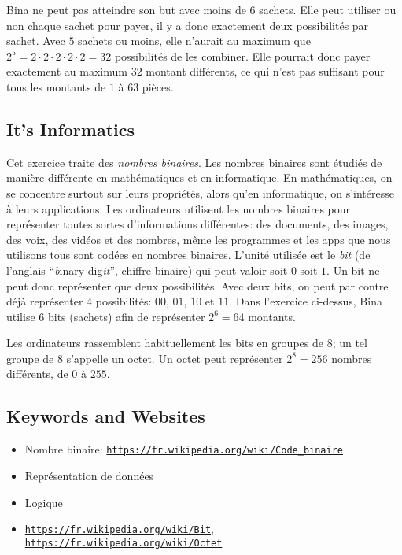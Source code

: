 \documentclass[a4paper,11pt]{report}
\newcommand{\BrochureUrlText}[1]{\texttt{#1}}
\begin{document}
Bina ne peut pas atteindre son but avec moins de $6$ sachets. Elle peut utiliser ou non chaque sachet pour payer, il y a donc exactement deux possibilités par sachet. Avec $5$ sachets ou moins, elle n’aurait au maximum que ${2^5 = 2 \cdot 2 \cdot 2 \cdot 2 \cdot 2 = 32}$ possibilités de les combiner. Elle pourrait donc payer exactement au maximum $32$ montant différents, ce qui n’est pas suffisant pour tous les montants de $1$ à $63$ pièces.


\subsection*{It’s Informatics}

Cet exercice traite des \emph{nombres binaires}. Les nombres binaires sont étudiés de manière différente en mathématiques et en informatique. En mathématiques, on se concentre surtout sur leurs propriétés, alors qu’en informatique, on s’intéresse à leurs applications. Les ordinateurs utilisent les nombres binaires pour représenter toutes sortes d’informations différentes: des documents, des images, des voix, des vidéos et des nombres, même les programmes et les apps que nous utilisons tous sont codées en nombres binaires. L’unité utilisée est le \emph{bit} (de l’anglais “\emph{b}inary dig\emph{it}”, chiffre binaire) qui peut valoir soit $0$ soit $1$. Un bit ne peut donc représenter que deux possibilités. Avec deux bits, on peut par contre déjà représenter $4$ possibilités: $00$, $01$, $10$ et $11$. Dans l’exercice ci-dessus, Bina utilise $6$ bits (sachets) afin de représenter ${2^6 = 64}$ montants.

Les ordinateurs rassemblent habituellement les bits en groupes de $8$; un tel groupe de $8$ s’appelle un octet. Un octet peut représenter ${2^8 = 256}$ nombres différents, de $0$ à $255$.

{\raggedright

\subsection*{Keywords and Websites}

\begin{itemize}
  \item Nombre binaire: \href{https://fr.wikipedia.org/wiki/Code_binaire}{\BrochureUrlText{https://fr.wikipedia.org/wiki/Code\_binaire}}
  \item Représentation de données
  \item Logique
  \item \href{https://fr.wikipedia.org/wiki/Bit}{\BrochureUrlText{https://fr.wikipedia.org/wiki/Bit}}, \href{https://fr.wikipedia.org/wiki/Octet}{\BrochureUrlText{https://fr.wikipedia.org/wiki/Octet}}
\end{itemize}


}
\end{document}
